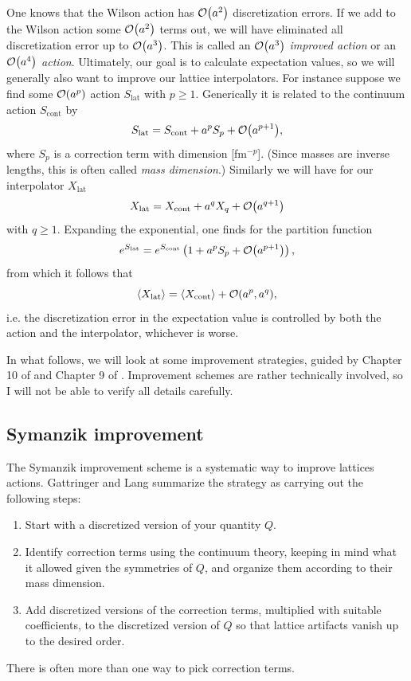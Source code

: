 One knows that the Wilson action has
$\order{a^2}$ discretization errors. If we add to the Wilson action some
$\order{a^2}$ terms out, we will have eliminated all discretization error
up to $\order{a^3}$. This is called an $\order{a^3}$ {\it improved action}
or an $\order{a^4}$ {\it action}. Ultimately, our goal is to calculate
expectation values, so we will generally also want to improve our 
lattice interpolators. For instance suppose we find some $\order{a^p}$
action $S_\text{lat}$ with $p\geq1$. Generically it is related to the 
continuum action $S_{\text{cont}}$ by
\begin{equation}
  S_\text{lat}=S_\text{cont}+a^pS_p+\order{a^{p+1}},
\end{equation}
where $S_p$ is a correction term with dimension [fm$^{-p}$]. (Since masses are
inverse lengths, this is often called {\it mass dimension}.) 
 Similarly we will
have for our interpolator $X_\text{lat}$ 
\begin{equation}
   X_\text{lat} = X_\text{cont}+a^qX_q +\order{a^{q+1}}
\end{equation}
with $q\geq1$. Expanding the exponential, one finds for the partition function
\begin{equation}
  e^{S_\text{lat}}=e^{S_\text{cont}}\left(1+a^pS_p+\order{a^{p+1}}\right),
\end{equation}
from which it follows that
\begin{equation}
\ev{X_\text{lat}}=\ev{X_\text{cont}}+\order{a^p,a^q},
\end{equation}
i.e. the discretization error in the expectation value is controlled by both
the action and the interpolator, whichever is worse.

In what follows, we will look at some improvement strategies, guided by 
Chapter 10 of \cite{degrand_lattice_2006} and Chapter 9 of
\cite{gattringer_quantum_2010}. Improvement schemes are rather technically
involved, so I will not be able to verify all details carefully.

\subsection{Symanzik improvement}

The Symanzik improvement scheme 
\cite{symanzik_continuum_1983,symanzik_continuum_1983-1} is a systematic way to
improve lattices actions. Gattringer and Lang summarize the strategy as
carrying out the following steps:
\begin{enumerate}
  \item Start with a discretized version of your quantity $Q$.
  \item Identify correction terms using the continuum theory, keeping in mind
        what it allowed given the symmetries of $Q$, and organize them according
        to their mass dimension.
  \item Add discretized versions of the correction terms, multiplied with
        suitable coefficients, to the discretized version of $Q$ so that 
        lattice artifacts vanish up to the desired order.
\end{enumerate}
There is often more than one way to pick correction terms.

